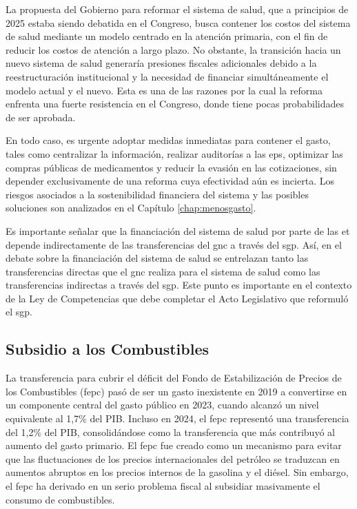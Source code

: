 La propuesta del Gobierno para reformar el sistema de salud, que a principios de 2025 estaba siendo debatida en el Congreso, busca contener los costos del sistema de salud mediante un modelo centrado en la atención primaria, con el fin de reducir los costos de atención a largo plazo. No obstante, la transición hacia un nuevo sistema de salud generaría presiones fiscales adicionales debido a la reestructuración institucional y la necesidad de financiar simultáneamente el modelo actual y el nuevo. Esta es una de las razones por la cual la reforma enfrenta una fuerte resistencia en el Congreso, donde tiene pocas probabilidades de ser aprobada.

En todo caso, es urgente adoptar medidas inmediatas para contener el gasto, tales como centralizar la información, realizar auditorías a las \gls{eps}, optimizar las compras públicas de medicamentos y reducir la evasión en las cotizaciones, sin depender exclusivamente de una reforma cuya efectividad aún es incierta. Los riesgos asociados a la sostenibilidad financiera del sistema y las posibles soluciones son analizados en el Capítulo \ref{chap:menosgasto}. 

Es importante señalar que la financiación del sistema de salud por parte de las \gls{et} depende indirectamente de las transferencias del \gls{gnc} a través del \gls{sgp}. Así, en el debate sobre la financiación del sistema de salud se entrelazan tanto las transferencias directas que el \gls{gnc} realiza para el sistema de salud como las transferencias indirectas a través del \gls{sgp}. Este punto es importante en el contexto de la Ley de Competencias que debe completar el Acto Legislativo que reformuló el \gls{sgp}.

\subsection{Subsidio a los Combustibles}

La transferencia para cubrir el déficit del Fondo de Estabilización de Precios de los Combustibles (\gls{fepc}) pasó de ser un gasto inexistente en 2019 a convertirse en un componente central del gasto público en 2023, cuando alcanzó un nivel equivalente al 1,7\% del PIB. Incluso en 2024, el \gls{fepc} representó una transferencia del 1,2\% del PIB, consolidándose como la transferencia que más contribuyó al aumento del gasto primario. El \gls{fepc} fue creado como un mecanismo para evitar que las fluctuaciones de los precios internacionales del petróleo se traduzcan en aumentos abruptos en los precios internos de la gasolina y el diésel. Sin embargo, el \gls{fepc} ha derivado en un serio problema fiscal al subsidiar masivamente el consumo de combustibles.

